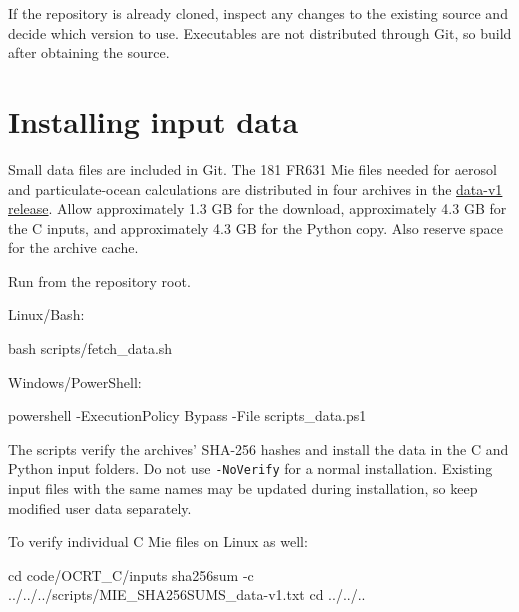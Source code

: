 If the repository is already cloned, inspect any changes to the existing source and decide which version to use. Executables are not distributed through Git, so build after obtaining the source.

\section{Installing input data}
\label{sec:auto:02_installation:2}
Small data files are included in Git. The 181 FR631 Mie files needed for aerosol and particulate-ocean calculations are distributed in four archives in the \href{https://github.com/brtnt/OCRT/releases/tag/data-v1}{data-v1 release}. Allow approximately 1.3 GB for the download, approximately 4.3 GB for the C inputs, and approximately 4.3 GB for the Python copy. Also reserve space for the archive cache.

Run from the repository root.

Linux/Bash:


\par\noindent\begin{minipage}{\linewidth}
\begin{ManualCode}
bash scripts/fetch_data.sh
\end{ManualCode}
\end{minipage}\par

Windows/PowerShell:


\par\noindent\begin{minipage}{\linewidth}
\begin{ManualCode}
powershell -ExecutionPolicy Bypass -File scripts\fetch_data.ps1
\end{ManualCode}
\end{minipage}\par

The scripts verify the archives' SHA-256 hashes and install the data in the C and Python input folders. Do not use \texttt{-\allowbreak{}NoVerify} for a normal installation. Existing input files with the same names may be updated during installation, so keep modified user data separately.

To verify individual C Mie files on Linux as well:


\par\noindent\begin{minipage}{\linewidth}
\begin{ManualCode}
cd code/OCRT_C/inputs
sha256sum -c ../../../scripts/MIE_SHA256SUMS_data-v1.txt
cd ../../..
\end{ManualCode}
\end{minipage}\par

